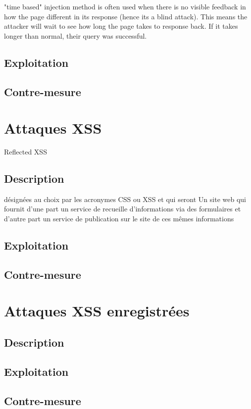 "time based" injection method is often used when there is no visible feedback in how the page different in its response (hence its a blind attack). This means the attacker will wait to see how long the page takes to response back. If it takes longer than normal, their query was successful.

\subsection{Exploitation}

\subsection{Contre-mesure}


\section{Attaques XSS }Reflected XSS

\subsection{Description}
 désignées au choix par les acronymes CSS ou XSS et qui seront
Un site web qui fournit d'une part un service de recueille d'informations via des formulaires et d'autre part un service de publication sur le site de ces mêmes informations
\subsection{Exploitation}

\subsection{Contre-mesure}


\section{Attaques XSS enregistrées }

\subsection{Description}

\subsection{Exploitation}

\subsection{Contre-mesure}

